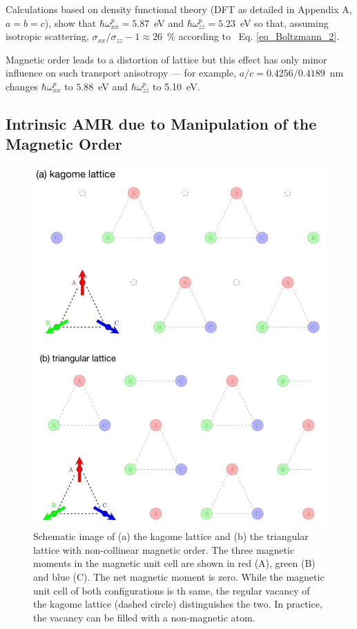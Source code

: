 \documentclass[prb,showpacs,amsmath,amssymb,superscriptaddress,twocolumn,floatfix]{revtex4-1}
\begin{document}
Calculations based on density functional theory (DFT as detailed in Appendix A, $a=b=c$), show that $\hbar\omega^p_{xx}=5.87$~eV and $\hbar\omega^p_{zz}=5.23$~eV so that, assuming isotropic scattering, $\sigma_{xx}/\sigma_{zz}-1\approx 26$~\% according to~ Eq. \ref{eq_Boltzmann_2}.

Magnetic order leads to a distortion of lattice but this effect has only minor influence on such transport anisotropy --- for example, $a/c=0.4256/0.4189$~nm changes $\hbar\omega^p_{xx}$ to $5.88$~eV and $\hbar\omega^p_{zz}$ to 5.10~eV.

\subsection{Intrinsic AMR due to Manipulation of the Magnetic Order}
\label{sec_I_Kagome}

\begin{figure}
	\centering
	\includegraphics[width=1\linewidth]{img/kagome_triangular_11.jpg}
	\caption{Schematic image of (a) the kagome lattice and (b) the triangular lattice with non-collinear magnetic order. The three magnetic moments in the magnetic unit cell are shown in red (A), green (B) and blue (C). The net magnetic moment is zero. While the magnetic unit cell of both configurations is th same, the regular vacancy of the kagome lattice (dashed circle) distinguishes the two. In practice, the vacancy can be filled with a non-magnetic atom.}
	\label{fig:kagome_triangular}
\end{figure}
\end{document}
